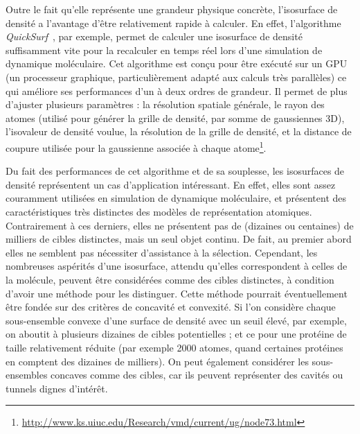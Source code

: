 	
	Outre le fait qu'elle représente une grandeur physique concrète, l'isosurface de densité a l'avantage d'être relativement rapide à calculer. En effet, l'algorithme \emph{QuickSurf}~\cite{krone2012fast, roberts2013lattice, stone2013early, stone2013gpu, stone2014gpu, sener2014visualization}, par exemple, permet de calculer une isosurface de densité suffisamment vite pour la recalculer en temps réel lors d'une simulation de dynamique moléculaire. Cet algorithme est conçu pour être exécuté sur un GPU (un processeur graphique, particulièrement adapté aux calculs très parallèles) ce qui améliore ses performances d'un à deux ordres de grandeur. Il permet de plus d'ajuster plusieurs paramètres : la résolution spatiale générale, le rayon des atomes (utilisé pour générer la grille de densité, par somme de gaussiennes 3D), l'isovaleur de densité voulue, la résolution de la grille de densité, et la distance de coupure utilisée pour la gaussienne associée à chaque atome\footnote{\url{http://www.ks.uiuc.edu/Research/vmd/current/ug/node73.html}}.
	
	Du fait des performances de cet algorithme et de sa souplesse, les isosurfaces de densité représentent un cas d'application intéressant. En effet, elles sont assez couramment utilisées en simulation de dynamique moléculaire, et présentent des caractéristiques très distinctes des modèles de représentation atomiques. Contrairement à ces derniers, elles ne présentent pas de (dizaines ou centaines) de milliers de cibles distinctes, mais un seul objet continu. De fait, au premier abord elles ne semblent pas nécessiter d'assistance à la sélection. Cependant, les nombreuses aspérités d'une isosurface, attendu qu'elles correspondent à celles de la molécule, peuvent être considérées comme des cibles distinctes, à condition d'avoir une méthode pour les distinguer. Cette méthode pourrait éventuellement être fondée sur des critères de concavité et convexité. Si l'on considère chaque sous-ensemble convexe d'une surface de densité avec un seuil élevé, par exemple, on aboutit à plusieurs dizaines de cibles potentielles ; et ce pour une protéine de taille relativement réduite (par exemple 2000 atomes, quand certaines protéines en comptent des dizaines de milliers). On peut également considérer les sous-ensembles concaves comme des cibles, car ils peuvent représenter des cavités ou tunnels\footnotemark{} dignes d'intérêt.
	
